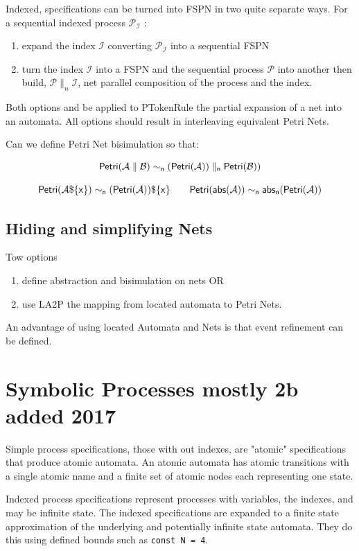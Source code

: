 \documentclass[]{article}
\begin{document}
{Indexed, specifications can be turned into FSPN in two quite separate ways. For a sequential indexed process $\mathcal{P_I}$ :
\begin{enumerate}
\item expand the  index $\mathcal{I}$ converting $\mathcal{P_I}$ into  a sequential FSPN
\item turn the index $\mathcal{I}$ into a FSPN and the sequential process $\mathcal{P}$  into another  then build, $\mathcal{P}\parallel_n \mathcal{I}$,  net parallel composition of  the process and the index.
\end{enumerate}
Both options and be applied to  {\sf PTokenRule} the partial expansion of a net into an automata.
All options  should result in interleaving equivalent Petri Nets.

Can we define Petri Net bisimulation so that:

\[{\sf Petri(\mathcal{A}\parallel \mathcal{B} ) \sim_n  (Petri(\mathcal{A}))\parallel_n Petri(\mathcal{B}))   }\]

\[{\sf Petri(\mathcal{A}\$\{x\}) \sim_n  (Petri(\mathcal{A}))\$\{x\}  \qquad     Petri(abs(\mathcal{A}))\sim_n  abs_n(Petri(\mathcal{A})) }\]


\subsection{Hiding and simplifying  Nets}
Tow options
\begin{enumerate}
\item define abstraction and bisimulation on nets OR
\item use {\sf LA2P} the mapping from located automata to Petri Nets.
\end{enumerate}
An advantage of using located Automata and Nets is that event refinement can be defined.

}
\section{ Symbolic Processes  {\color{red} mostly 2b added 2017}}
Simple process specifications, those with out indexes, are "atomic" specifications that produce atomic automata.   An atomic  automata has atomic transitions with  a single atomic name and  a finite set of  atomic  nodes each   representing  one state.

Indexed process specifications represent processes with variables, the indexes, and may be infinite state. The indexed specifications are expanded to a finite state approximation of the underlying and potentially infinite state automata. They do this using defined bounds such as \verb|const N = 4|.
\end{document}
